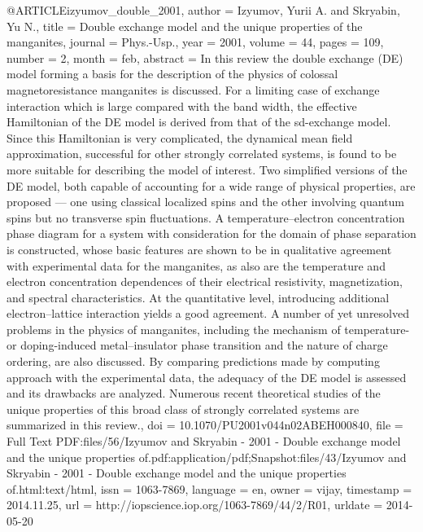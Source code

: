 @ARTICLE{izyumov_double_2001,
  author = {Izyumov, Yurii A. and Skryabin, Yu N.},
  title = {Double exchange model and the unique properties of the manganites},
  journal = {Phys.-Usp.},
  year = {2001},
  volume = {44},
  pages = {109},
  number = {2},
  month = feb,
  abstract = {In this review the double exchange ({DE)} model forming a basis for
	the description of the physics of colossal magnetoresistance manganites
	is discussed. For a limiting case of exchange interaction which is
	large compared with the band width, the effective Hamiltonian of
	the {DE} model is derived from that of the sd-exchange model. Since
	this Hamiltonian is very complicated, the dynamical mean field approximation,
	successful for other strongly correlated systems, is found to be
	more suitable for describing the model of interest. Two simplified
	versions of the {DE} model, both capable of accounting for a wide
	range of physical properties, are proposed — one using classical
	localized spins and the other involving quantum spins but no transverse
	spin fluctuations. A temperature–electron concentration phase diagram
	for a system with consideration for the domain of phase separation
	is constructed, whose basic features are shown to be in qualitative
	agreement with experimental data for the manganites, as also are
	the temperature and electron concentration dependences of their electrical
	resistivity, magnetization, and spectral characteristics. At the
	quantitative level, introducing additional electron–lattice interaction
	yields a good agreement. A number of yet unresolved problems in the
	physics of manganites, including the mechanism of temperature- or
	doping-induced metal–insulator phase transition and the nature
	of charge ordering, are also discussed. By comparing predictions
	made by computing approach with the experimental data, the adequacy
	of the {DE} model is assessed and its drawbacks are analyzed. Numerous
	recent theoretical studies of the unique properties of this broad
	class of strongly correlated systems are summarized in this review.},
  doi = {10.1070/PU2001v044n02ABEH000840},
  file = {Full Text PDF:files/56/Izyumov and Skryabin - 2001 - Double exchange model and the unique properties of.pdf:application/pdf;Snapshot:files/43/Izyumov and Skryabin - 2001 - Double exchange model and the unique properties of.html:text/html},
  issn = {1063-7869},
  language = {en},
  owner = {vijay},
  timestamp = {2014.11.25},
  url = {http://iopscience.iop.org/1063-7869/44/2/R01},
  urldate = {2014-05-20}
}

